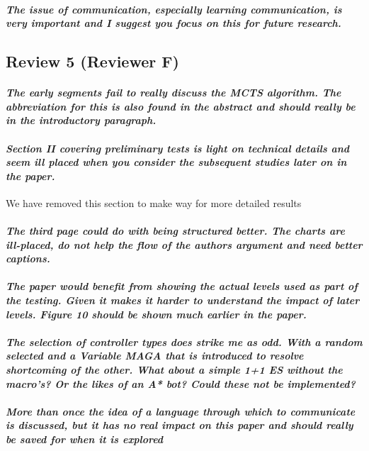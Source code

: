 \documentclass{article}
\begin{document}
\paragraph*{\textit{The issue of communication, especially learning communication, is very important and I suggest you focus on this for future research.}}
\subsection{Review 5 (Reviewer F)}
\paragraph*{\textit{The early segments fail to really discuss the MCTS algorithm.  The abbreviation for this is also found in the abstract and should really be in the introductory paragraph.}}
\paragraph*{\textit{Section II covering preliminary tests is light on technical details and seem ill placed when you consider the subsequent studies later on in the paper.}}
We have removed this section to make way for more detailed results
\paragraph*{\textit{The third page could do with being structured better.  The charts are ill-placed, do not help the flow of the authors argument and need better captions.}}
\paragraph*{\textit{The paper would benefit from showing the actual levels used as part of the testing.  Given it makes it harder to understand the impact of later levels.  Figure 10 should be shown much earlier in the paper.}}
\paragraph*{\textit{The selection of controller types does strike me as odd.  With a random selected and a Variable MAGA that is introduced to resolve shortcoming of the other.  What about a simple 1+1 ES without the macro's?  Or the likes of an A* bot?  Could these not be implemented?}}
\paragraph*{\textit{More than once the idea of a language through which to communicate is discussed, but it has no real impact on this paper and should really be saved for when it is explored}}



\end{document}
